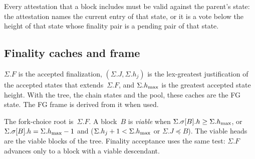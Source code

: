 Every attestation that a block includes must be valid against the
parent's state: the attestation names the current entry of that state, or
it is a vote below the height of that state whose finality pair is a
pending pair of that state.

\subsection{Finality caches and frame}\label{sec:fg-frame}

$\Sigma.F$ is the accepted finalization, $(\Sigma.J,\Sigma.h_j)$ is the
lex-greatest justification of the accepted states that
extends~$\Sigma.F$, and $\Sigma.h_{\max}$ is the greatest accepted state
height.  With the tree, the chain states and the pool, these caches are the FG
state.  The FG frame is derived from it when used.

The fork-choice root is~$\Sigma.F$.  A block~$B$
is \emph{viable} when $\Sigma.\sigma[B].h\geq\Sigma.h_{\max}$, or
$\Sigma.\sigma[B].h=\Sigma.h_{\max}-1$ and ($\Sigma.h_j+1<\Sigma.h_{\max}$ or
$\Sigma.J\preceq B$).  The viable heads are the viable blocks of the tree.
Finality acceptance uses the same test: $\Sigma.F$ advances only to a block
with a viable descendant.


